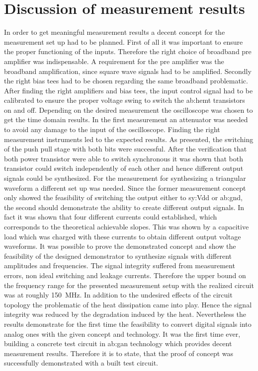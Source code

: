 \section{Discussion of measurement results}
In order to get meaningful measurement results a decent concept for the measurement set up had to be planned.
First of all it was important to ensure the proper functioning of the inputs.
Therefore the right choice of broadband pre amplifier was indispensable.
A requirement for the pre amplifier was the broadband amplification, since square wave signals had to be amplified.
Secondly the right bias tees had to be chosen regarding the same broadband problematic.
After finding the right amplifiers and bias tees, the input control signal had to be calibrated to ensure the proper voltage swing to switch the \gls{ab:hemt} transistors on and off.
Depending on the desired measurement the oscilloscope was chosen to get the time domain results.
In the first measurement an attenuator was needed to avoid any damage to the input of the oscilloscope.
Finding the right measurement instruments led to the expected results.
As presented, the switching of the push pull stage with both bits were successful.
After the verification that both power transistor were able to switch synchronous it was shown that both transistor could switch independently of each other and hence different output signals could be synthesized.
For the measurement for synthesizing a triangular waveform a different set up was needed.
Since the former measurement concept only showed the feasibility of switching the output either to \gls{sy:Vdd} or \gls{ab:gnd}, the second should demonstrate the ability to create different output signals.
In fact it was shown that four different currents could established, which corresponds to the theoretical achievable slopes.
This was shown by a capacitive load which was charged with these currents to obtain different output voltage waveforms.
It was possible to prove the demonstrated concept and show the feasibility of the designed demonstrator to synthesize signals with different amplitudes and frequencies.
The signal integrity suffered from measurement errors, non ideal switching and leakage currents.
Therefore the upper bound on the frequency range for the presented measurement setup with the realized circuit was at roughly \SI{150}{\mega \hertz}.
In addition to the undesired effects of the circuit topology the problematic of the heat dissipation came into play.
Hence the signal integrity was reduced by the degradation induced by the heat.
Nevertheless the results demonstrate for the first time the feasibility to convert digital signals into analog ones with the given concept and technology.
It was the first time ever, building a concrete test circuit in \gls{ab:gan} technology which provides decent measurement results.
Therefore it is to state, that the proof of concept was successfully demonstrated with a built test circuit.
